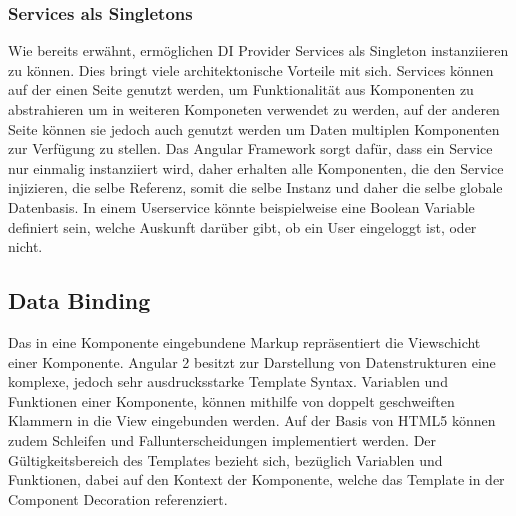 \vspace{0.2cm}

\vspace{0.2cm}

\vspace{0.2cm}

\vspace{0.2cm}


\subsubsection{Services als Singletons}
\label{Services-als-Singletons}

Wie bereits erwähnt, ermöglichen \ac{DI} Provider Services als Singleton instanziieren zu können.
Dies bringt viele architektonische Vorteile mit sich. Services können auf der einen Seite genutzt werden,
um Funktionalität aus Komponenten zu abstrahieren um in weiteren Komponeten verwendet zu werden,
auf der anderen Seite können sie jedoch auch genutzt werden um Daten multiplen Komponenten zur Verfügung zu stellen.
Das Angular Framework sorgt dafür, dass ein Service nur einmalig instanziiert wird, daher erhalten alle
Komponenten, die den Service injizieren, die selbe Referenz, somit die selbe Instanz und daher die selbe globale Datenbasis.
In einem Userservice könnte beispielweise eine Boolean Variable definiert sein, welche Auskunft darüber gibt,
ob ein User eingeloggt ist, oder nicht. \cite[308]{Angular2}


\subsection{Data Binding}
Das in eine Komponente eingebundene Markup repräsentiert die Viewschicht einer Komponente.
Angular 2 besitzt zur Darstellung von Datenstrukturen eine komplexe, jedoch sehr ausdrucksstarke Template Syntax.
Variablen und Funktionen einer Komponente, können mithilfe von doppelt geschweiften Klammern in die View eingebunden werden.
Auf der Basis von HTML5 können zudem Schleifen und Fallunterscheidungen implementiert werden.
Der Gültigkeitsbereich des Templates bezieht sich, bezüglich Variablen und Funktionen, dabei auf den Kontext der Komponente,
welche das Template in der Component Decoration referenziert. \cite{Templ78:online}

\vspace{1cm}

\vspace{1cm}

